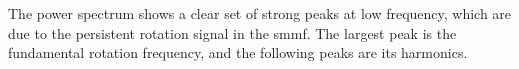 The power spectrum shows a clear set of strong peaks at low frequency, which are due to the persistent rotation signal in the \gls{smmf}. The largest peak is the fundamental rotation frequency, and the following peaks are its harmonics.


%
%
%
%
